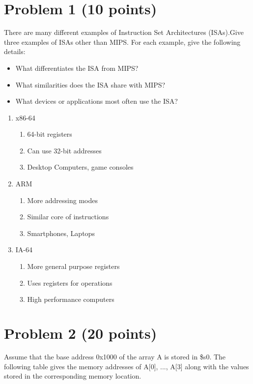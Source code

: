 \documentclass{article}
\begin{document}
\section*{Problem 1 (10 points)}
There are many different examples of Instruction Set Architectures (ISAs).Give three examples of ISAs other than MIPS. For each example, give the following details:
\begin{itemize}
    \item What differentiates the ISA from MIPS?
    \item What similarities does the ISA share with MIPS?
    \item What devices or applications most often use the ISA?
\end{itemize}
\begin{enumerate}
        \item x86-64
        \begin{enumerate}
            \item 64-bit registers
            \item Can use 32-bit addresses
            \item Desktop Computers, game consoles
        \end{enumerate}
        \item ARM
        \begin{enumerate}
            \item More addressing modes
            \item Similar core of instructions
            \item Smartphones, Laptops
        \end{enumerate}
        \item IA-64
        \begin{enumerate}
            \item More general purpose registers
            \item Uses registers for operations
            \item High performance computers
        \end{enumerate}
    \end{enumerate}
\section*{Problem 2 (20 points)}
Assume that the base address 0x1000 of the array A is stored in \$s0.  The following table gives the memory addresses of A[0], ..., A[3] along with the values stored in the corresponding memory location.
\end{document}
